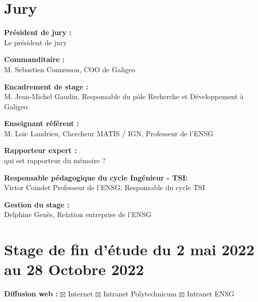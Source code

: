 \thispagestyle{plain}
\section*{Jury}
\vspace{0.5cm}

\textbf{Président de jury :} \\

Le président de jury

\vspace{0.5cm}

\textbf{Commanditaire :} \\

M. Sebastien Connesson, COO de Galigeo

\vspace{0.5cm}

\textbf{Encadrement de stage :} \\ 

M. Jean-Michel Gaudin, Responsable du pôle Recherche et Développement à Galigeo

\vspace{0.5cm}

\textbf{Enseignant référent :} \\ 

M. Loic Landrieu, Chercheur MATIS / IGN, Professeur de l'ENSG

\vspace{0.5cm}

\textbf{Rapporteur expert :} \\ 

qui est rapporteur du mémoire ?

\vspace{0.5cm}

\textbf{Responsable pédagogique du cycle Ingénieur - TSI:} \\

Victor Coindet
Professeur de l'ENSG, Responsable du cycle TSI

\vspace{0.5cm}

\textbf{Gestion du stage :} \\ 

Delphine Genès, Relation entreprise de l'ENSG

\vspace{0.5cm}


\section*{Stage de fin d'étude du 2 mai 2022 au 28 Octobre 2022}
\vspace{0.3cm}
\textbf{Diffusion web :} $\boxtimes$ Internet \hspace{0.2cm}$\boxtimes$ Intranet Polytechnicum\hspace{0.2cm}
$\boxtimes$ Intranet ENSG\vspace{0.3cm}

